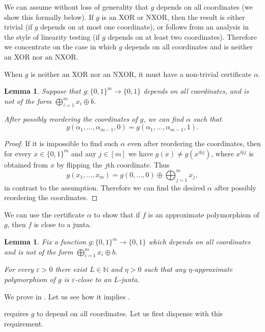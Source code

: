 \documentclass{article}
\newtheorem{lemma}[theorem]{Lemma}
\theoremstyle{definition}
\theoremstyle{remark}
\newcommand\eps{\varepsilon}
\renewcommand\epsilon{\eps}
\begin{document}
We can assume without loss of generality that $g$ depends on all coordinates (we show this formally below). If $g$ is an XOR or NXOR, then the result is either trivial (if $g$ depends on at most one coordinate), or follows from an analysis in the style of linearity testing (if $g$ depends on at least two coordinates). Therefore we concentrate on the case in which $g$ depends on all coordinates and is neither an XOR nor an NXOR.

When $g$ is neither an XOR nor an NXOR, it must have a non-trivial certificate $\alpha$.

\begin{lemma} \label{lem:g-alpha-beta}
Suppose that $g\colon \{0,1\}^m \to \{0,1\}$ depends on all coordinates, and is not of the form $\bigoplus_{i=1}^m x_i \oplus b$.

After possibly reordering the coordinates of $g$, we can find $\alpha$ such that
\[
 g(\alpha_1,\ldots,\alpha_{m-1},0) = g(\alpha_1,\ldots,\alpha_{m-1},1).
\]
\end{lemma}
\begin{proof}
If it is impossible to find such $\alpha$ even after reordering the coordinates, then for every $x \in \{0,1\}^m$ and any $j \in [m]$ we have $g(x) \neq g(x^{\oplus j})$, where $x^{\oplus j}$ is obtained from $x$ by flipping the $j$th coordinate. Thus
\[
 g(x_1,\ldots,x_m) = g(0,\ldots,0) \oplus \bigoplus_{j=1}^m x_j,
\]
in contrast to the assumption. Therefore we can find the desired $\alpha$ after possibly reordering the coordinates.
\end{proof}

We can use the certificate $\alpha$ to show that if $f$ is an approximate polymorphism of $g$, then $f$ is close to a junta.

\begin{lemma} \label{lem:f-junta}
Fix a function $g\colon \{0,1\}^m \to \{0,1\}$ which depends on all coordinates and is not of the form $\bigoplus_{i=1}^m x_i \oplus b$.

For every $\epsilon > 0$ there exist $L \in \mathbb{N}$ and $\eta > 0$ such that any $\eta$-approximate polymorphism of $g$ is $\epsilon$-close to an $L$-junta.
\end{lemma}

We prove  in . Let us see how it implies .

 requires $g$ to depend on all coordinates. Let us first dispense with this requirement.
\end{document}
